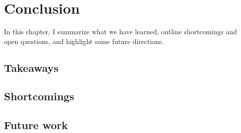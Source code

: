 \chapter{Conclusion}
\label{chap:conclusion}

In this chapter, I summarize what we have learned, outline shortcomings and open questions, and highlight some future directions.

\section{Takeaways}

\section{Shortcomings}

\section{Future work}